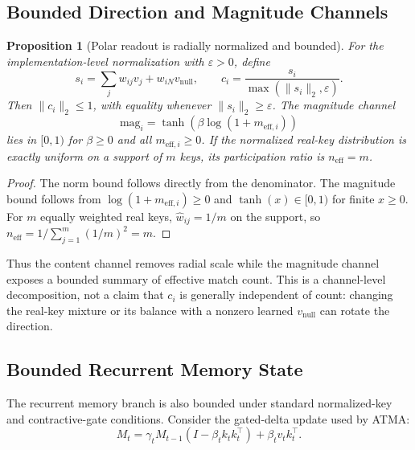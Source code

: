 \documentclass{article} %
\newtheorem{proposition}{Proposition}
\begin{document}
\subsection{Bounded Direction and Magnitude Channels}

\begin{proposition}[Polar readout is radially normalized and bounded]
For the implementation-level normalization with $\varepsilon>0$, define
\begin{equation}
    s_i = \sum_j w_{ij}v_j + w_{iN}v_{\mathrm{null}},
    \qquad
    c_i = \frac{s_i}{\max(\lVert s_i\rVert_2,\varepsilon)}.
\end{equation}
Then $\lVert c_i\rVert_2\le1$, with equality whenever
$\lVert s_i\rVert_2\ge\varepsilon$. The magnitude channel
\begin{equation}
    \mathrm{mag}_i =
    \tanh\left(\beta\log(1+m_{\mathrm{eff},i})\right)
\end{equation}
lies in $[0,1)$ for $\beta\ge0$ and all $m_{\mathrm{eff},i}\ge0$. If the normalized
real-key distribution is exactly uniform on a support of $m$ keys, its participation ratio is
$n_{\mathrm{eff}}=m$.
\end{proposition}

\begin{proof}
The norm bound follows directly from the denominator. The magnitude bound follows
from $\log(1+m_{\mathrm{eff},i})\ge0$ and $\tanh(x)\in[0,1)$ for finite $x\ge0$. For $m$
equally weighted real keys, $\hat{w}_{ij}=1/m$ on the support, so
$n_{\mathrm{eff}}=1/\sum_{j=1}^{m}(1/m)^2=m$.
\end{proof}

Thus the content channel removes radial scale while the magnitude channel exposes a bounded
summary of effective match count. This is a channel-level decomposition, not a claim that
$c_i$ is generally independent of count: changing the real-key mixture or its balance with a
nonzero learned $v_{\mathrm{null}}$ can rotate the direction.

\subsection{Bounded Recurrent Memory State}

The recurrent memory branch is also bounded under standard normalized-key and contractive-gate
conditions. Consider the gated-delta update used by ATMA:
\begin{equation}
    M_t = \gamma_t M_{t-1}(I-\beta_t k_tk_t^\top) + \beta_t v_tk_t^\top .
\end{equation}
\end{document}
